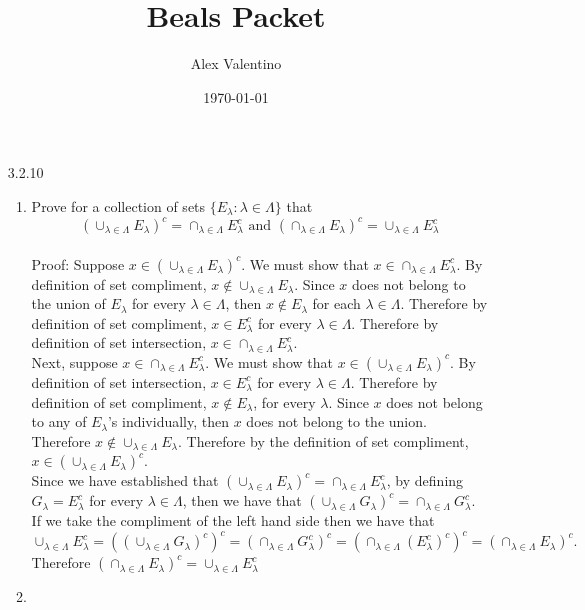 \documentclass[12pt, letterpaper]{article}
\date{\today}
\author{Alex Valentino}
\title{Beals Packet}
\begin{document}
	\begin{enumerate}
		\item[3.2.10]
			\begin{enumerate}
				\item Prove for a collection of sets $\{E_\lambda : \lambda \in \Lambda\}$ that 
				$$
				\displaystyle (\cup_{\lambda \in \Lambda} E_\lambda )^c = \cap_{\lambda \in \Lambda} E_\lambda^c \text{ and } (\cap_{\lambda \in \Lambda} E_\lambda )^c = \cup_{\lambda \in \Lambda} E_\lambda^c
				$$\\
			Proof:  Suppose $x \in (\cup_{\lambda \in \Lambda} E_\lambda )^c$.
			We must show that $x \in \cap_{\lambda \in \Lambda} E_\lambda^c$. By
			definition of set compliment, $x \not \in \cup_{\lambda \in \Lambda} E_\lambda $.  Since $x$ does not belong to the union of $E_\lambda$ for every 
			$\lambda \in \Lambda$, then $x \not \in E_\lambda$ for each $\lambda \in \Lambda$.
			Therefore by definition of set compliment, $x \in E_\lambda^c$ for
			every $\lambda \in \Lambda$.  Therefore by definition of set intersection, $x \in \cap_{\lambda \in \Lambda} E_\lambda^c$.  \\
			Next, suppose $x \in \cap_{\lambda \in \Lambda} E_{\lambda}^c$.
			We must show that $x \in (\cup_{\lambda \in \Lambda} E_\lambda )^c$.
			By definition of set intersection, $x \in E_{\lambda}^c$ for every
			$\lambda \in \Lambda$.  Therefore by definition of set compliment,
			$x \not \in E_{\lambda}$, for every $\lambda$.  Since $x$ does not belong to any of $E_\lambda$'s individually, then $x$ does not belong to the union.
			Therefore $x \not \in \cup_{\lambda \in \Lambda} E_{\lambda}$.
			Therefore by the definition of set compliment, 
			$x  \in (\cup_{\lambda \in \Lambda} E_{\lambda})^c$.\\
			Since we have established that $(\cup_{\lambda \in \Lambda} E_\lambda )^c = \cap_{\lambda \in \Lambda} E_\lambda^c$, by defining $G_{\lambda} = E_{\lambda}^c$ for every $\lambda \in \Lambda$, then we have that $(\cup_{\lambda \in \Lambda} G_\lambda )^c = \cap_{\lambda \in \Lambda} G_\lambda^c$.  If we take the compliment of the left hand side then we have that
			$$
				\cup_{\lambda \in \Lambda} E_\lambda^c  =
				((\cup_{\lambda \in \Lambda} G_\lambda )^c)^c =
				(\cap_{\lambda \in \Lambda} G_\lambda^c)^c =
				(\cap_{\lambda \in \Lambda} (E_\lambda^c)^c)^c =
				(\cap_{\lambda \in \Lambda} E_\lambda)^c.
			$$
			Therefore $(\cap_{\lambda \in \Lambda} E_\lambda )^c = \cup_{\lambda \in \Lambda} E_\lambda^c$
			\item
			\begin{enumerate}

\end{enumerate}
\end{enumerate}
\end{enumerate}
\end{document}
